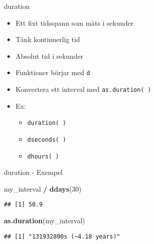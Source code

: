 \documentclass[
  11pt,
  ignorenonframetext,
  handout]{beamer}
\newenvironment{Shaded}{\begin{snugshade}}{\end{snugshade}}
\newcommand{\DecValTok}[1]{\textcolor[rgb]{0.00,0.00,0.81}{#1}}
\newcommand{\FunctionTok}[1]{\textcolor[rgb]{0.13,0.29,0.53}{\textbf{#1}}}
\newcommand{\NormalTok}[1]{#1}
\newcommand{\SpecialCharTok}[1]{\textcolor[rgb]{0.81,0.36,0.00}{\textbf{#1}}}
\providecommand{\tightlist}{%
  \setlength{\itemsep}{0pt}\setlength{\parskip}{0pt}}
\begin{document}
\begin{frame}{duration}
\label{duration}
\begin{itemize}
\tightlist
\item
  Ett fixt tidsspann som mäts i sekunder
\item
  Tänk kontinuerlig tid
\item
  Absolut tid i sekunder
\item
  Funktioner börjar med \texttt{d}
\item
  Konvertera ett interval med \texttt{as.duration( )}
\item
  Ex:

  \begin{itemize}
  \tightlist
  \item
    \texttt{duration( )}
  \item
    \texttt{dseconds( )}
  \item
    \texttt{dhours( )}
  \end{itemize}
\end{itemize}
\end{frame}

\begin{frame}[fragile]{duration - Exempel}
\label{duration---exempel}
\begin{Shaded}
\begin{Highlighting}[]
\NormalTok{my\_interval }\SpecialCharTok{/} \FunctionTok{ddays}\NormalTok{(}\DecValTok{30}\NormalTok{)}
\end{Highlighting}
\end{Shaded}

\begin{verbatim}
## [1] 50.9
\end{verbatim}

\begin{Shaded}
\begin{Highlighting}[]
\FunctionTok{as.duration}\NormalTok{(my\_interval)}
\end{Highlighting}
\end{Shaded}

\begin{verbatim}
## [1] "131932800s (~4.18 years)"
\end{verbatim}
\end{frame}
\end{document}
